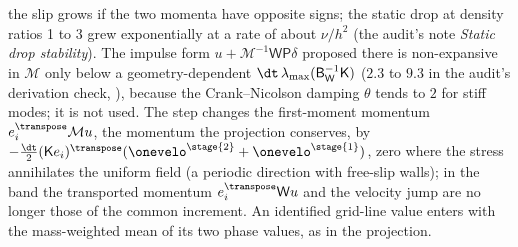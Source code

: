 the slip grows if the two momenta have opposite signs; the static drop
at density ratios 1 to 3 grew exponentially at a rate of about $\nu/h^2$ (the
audit's note \emph{Static drop stability}). The impulse form
$u+\mathcal M^{-1}\mathsf W\mathsf P\delta$ proposed there is non-expansive in
$\mathcal M$ only below a geometry-dependent $\dt\,\lambda_{\max}(\mathsf B_{\mathsf W}^{-1}\mathsf K)$
($2.3$ to $9.3$ in the audit's derivation check,
), because the Crank--Nicolson
damping $\theta$ tends to $2$ for stiff modes; it is not used. The step
changes the first-moment momentum $e_i^{\transpose}\mathcal Mu$, the momentum
the projection conserves, by
$-\tfrac{\dt}2(\mathsf Ke_i)^{\transpose}(\onevelo^{\stage{2}}+\onevelo^{\stage{1}})$,
zero where the stress annihilates the uniform field (a periodic direction
with free-slip walls); in the band the transported momentum
$e_i^{\transpose}\mathsf Wu$ and the velocity jump are no longer those of the
common increment. An identified grid-line value enters with the
mass-weighted mean of its two phase values, as in the projection.

